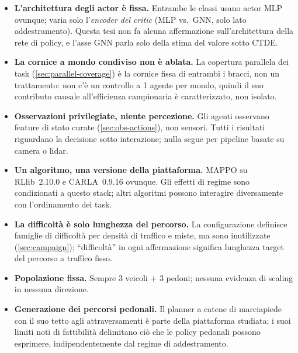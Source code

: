 \begin{itemize}
  \item \textbf{L'architettura degli actor è fissa.} Entrambe le classi
        usano actor MLP ovunque; varia solo l'\emph{encoder del critic}
        (MLP vs.\ GNN, solo lato addestramento). Questa tesi non fa
        alcuna affermazione sull'architettura della rete di policy, e
        l'asse GNN parla solo della stima del valore sotto CTDE.
  \item \textbf{La cornice a mondo condiviso non è ablata.} La
        copertura parallela dei task (\cref{sec:parallel-coverage}) è
        la cornice fissa di entrambi i bracci, non un trattamento: non
        c'è un controllo a 1 agente per mondo, quindi il suo contributo
        causale all'efficienza campionaria è caratterizzato, non
        isolato.
  \item \textbf{Osservazioni privilegiate, niente percezione.} Gli
        agenti osservano feature di stato curate
        (\cref{sec:obs-actions}), non sensori. Tutti i risultati
        riguardano la decisione sotto interazione; nulla segue per
        pipeline basate su camera o lidar.
  \item \textbf{Un algoritmo, una versione della piattaforma.} MAPPO su
        RLlib~2.10.0 e CARLA~0.9.16 ovunque. Gli effetti di regime sono
        condizionati a questo stack; altri algoritmi possono interagire
        diversamente con l'ordinamento dei task.
  \item \textbf{La difficoltà è solo lunghezza del percorso.} La
        configurazione definisce famiglie di difficoltà per densità di
        traffico e miste, ma sono inutilizzate (\cref{sec:campaign});
        ``difficoltà'' in ogni affermazione significa lunghezza target
        del percorso a traffico fisso.
  \item \textbf{Popolazione fissa.} Sempre 3 veicoli $+$ 3 pedoni;
        nessuna evidenza di scaling in nessuna direzione.
  \item \textbf{Generazione dei percorsi pedonali.} Il planner a catene
        di marciapiede con il suo tetto agli attraversamenti è parte
        della piattaforma studiata; i suoi limiti noti di fattibilità
        delimitano ciò che le policy pedonali possono esprimere,
        indipendentemente dal regime di addestramento.
\end{itemize}

